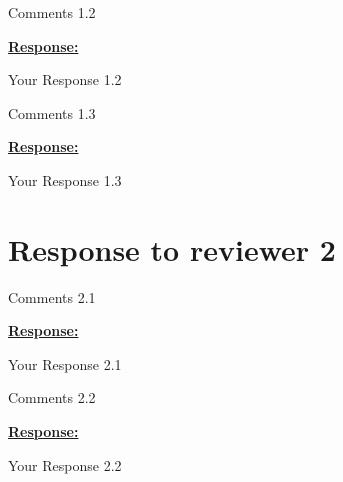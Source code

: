 \vspace{0.3cm}


\begin{cmt}{}{}

Comments 1.2

\end{cmt}
\vspace{0.1cm}
\noindent
\underline{\textbf{Response:}}
\vspace{0.2cm}

Your Response 1.2

\vspace{0.3cm}


\begin{cmt}{}{}

Comments 1.3

\end{cmt}
\vspace{0.1cm}
\noindent
\underline{\textbf{Response:}}
\vspace{0.2cm}

Your Response 1.3

\vspace{0.3cm}



\newpage
\section{Response to reviewer 2}

\begin{cmt}{}{}

Comments 2.1

\end{cmt}
\vspace{0.1cm}
\noindent
\underline{\textbf{Response:}}
\vspace{0.2cm}

Your Response 2.1

\vspace{0.3cm}


\begin{cmt}{}{}

Comments 2.2

\end{cmt}
\vspace{0.1cm}
\noindent
\underline{\textbf{Response:}}
\vspace{0.2cm}

Your Response 2.2

